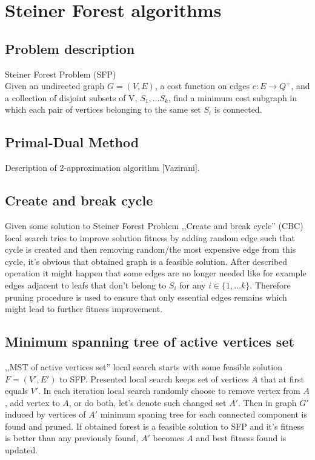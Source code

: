 \chapter{Steiner Forest algorithms}

\section{Problem description}
Steiner Forest Problem (SFP)\\
Given an undirected graph $G = (V, E)$, a cost function on edges $c : E \rightarrow Q^+$, and a collection of disjoint subsets of V, $S_1, \dots S_k$, find a minimum cost subgraph in which each pair of vertices belonging to the same set $S_i$ is connected.

\section{Primal-Dual Method}
Description of 2-approximation algorithm [Vazirani].

\section{Create and break cycle}
Given some solution to Steiner Forest Problem ,,Create and break cycle'' (CBC) local search tries to improve solution fitness by adding random edge such that cycle is created and then removing random/the most expensive edge from this cycle, it's obvious that obtained graph is a feasible solution. After described operation it might happen that some edges are no longer needed like for example edges adjacent to leafs that don't belong to $S_i$ for any $i \in \{1, \dots k\}$. Therefore pruning procedure is used to ensure that only essential edges remains which might lead to further fitness improvement.

\section{Minimum spanning tree of active vertices set}
,,MST of active vertices set'' local search starts with some feasible solution $F = (V', E')$ to SFP. Presented local search keeps set of vertices $A$ that at first equals $V'$. In each iteration local search randomly choose to remove vertex from $A$, add vertex to $A$, or do both, let's denote such changed set $A'$. Then in graph $G'$ induced by vertices of $A'$ minimum spaning tree for each connected component is found and pruned. If obtained forest is a feasible solution to SFP and it's fitness is better than any previously found, $A'$ becomes $A$ and best fitness found is updated.

